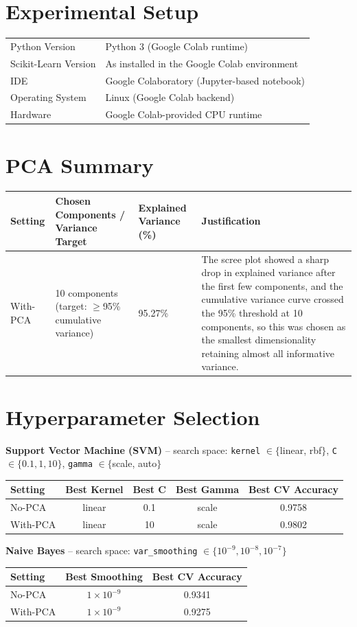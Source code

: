 \documentclass[12pt,a4paper]{article}
\begin{document}
\section{Experimental Setup}
\begin{tabular}{ll}
\toprule
Python Version & Python 3 (Google Colab runtime)\\
Scikit-Learn Version & As installed in the Google Colab environment\\
IDE & Google Colaboratory (Jupyter-based notebook)\\
Operating System & Linux (Google Colab backend)\\
Hardware & Google Colab-provided CPU runtime\\
\bottomrule
\end{tabular}

\section{PCA Summary}
\begin{longtable}{|p{3cm}|p{4cm}|p{3cm}|p{6cm}|}
\hline
Setting & Chosen Components / Variance Target & Explained Variance (\%) & Justification\\ \hline
With-PCA & 10 components (target: $\geq$95\% cumulative variance) & 95.27\% & The scree plot showed a sharp drop in explained variance after the first few components, and the cumulative variance curve crossed the 95\% threshold at 10 components, so this was chosen as the smallest dimensionality retaining almost all informative variance.\\ \hline
\end{longtable}

\section{Hyperparameter Selection}

\textbf{Support Vector Machine (SVM)} -- search space: \texttt{kernel} $\in\{$linear, rbf$\}$, \texttt{C} $\in\{0.1,1,10\}$, \texttt{gamma} $\in\{$scale, auto$\}$
\begin{longtable}{lcccc}
\toprule
Setting & Best Kernel & Best C & Best Gamma & Best CV Accuracy\\
\midrule
No-PCA & linear & 0.1 & scale & 0.9758\\
With-PCA & linear & 10 & scale & 0.9802\\
\bottomrule
\end{longtable}

\textbf{Naive Bayes} -- search space: \texttt{var\_smoothing} $\in\{10^{-9},10^{-8},10^{-7}\}$
\begin{longtable}{lcc}
\toprule
Setting & Best Smoothing & Best CV Accuracy\\
\midrule
No-PCA & $1\times10^{-9}$ & 0.9341\\
With-PCA & $1\times10^{-9}$ & 0.9275\\
\bottomrule
\end{longtable}
\end{document}
